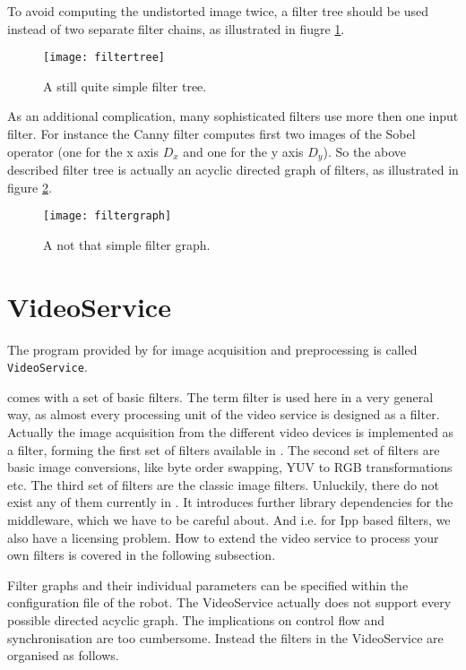 To avoid computing the undistorted image twice, a filter tree should
be used instead of two separate filter chains, as illustrated in
fiugre \ref{fig:filterTree}.

\begin{figure}[!ht]
  \begin{center}
    \texttt{[image: filtertree]}
  \end{center}
\caption{A still quite simple filter tree.}
\label{fig:filterTree}
\end{figure}

As an additional complication, many sophisticated filters use more
then one input filter. For instance the Canny filter computes first
two images of the Sobel operator (one for the x axis $D_x$ and one for the y
axis $D_y$). So the above described filter tree is actually an acyclic
directed graph of filters, as illustrated in figure \ref{fig:filterGraph}.

\begin{figure}[!ht]
  \begin{center}
    \texttt{[image: filtergraph]}
  \end{center}
\caption{A not that simple filter graph.}
\label{fig:filterGraph}
\end{figure}

\section{VideoService}

The program provided by \miro for image acquisition and preprocessing
is called {\tt VideoService}.

\miro comes with a set of basic filters. The term filter is used here
in a very general way, as almost every processing unit of the video
service is designed as a filter. Actually the image acquisition from
the different video devices is implemented as a filter, forming the
first set of filters available in \miro. The second set of filters are
basic image conversions, like byte order swapping, YUV to RGB
transformations etc. The third set of filters are the classic image
filters. Unluckily, there do not exist any of them currently in \miro.
It introduces further library dependencies for the middleware, which
we have to be careful about. And i.e. for Ipp based filters, we also
have a licensing problem. How to extend the video service to process
your own filters is covered in the following subsection.

Filter graphs and their individual parameters can be specified within
the configuration file of the robot. The VideoService actually does
not support every possible directed acyclic graph. The implications on
control flow and synchronisation are too cumbersome. Instead the
filters in the VideoService are organised as follows.

